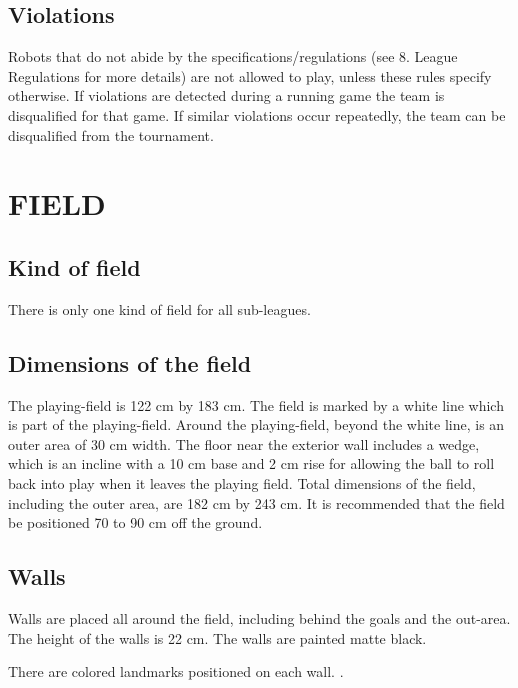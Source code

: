 \documentclass{article}
\begin{document}
\subsection{ Violations \label{ref-027}}

Robots that do not abide by the specifications/regulations (see 8. League
Regulations for more details) are not allowed to play, unless these rules
specify otherwise. If violations are detected during a running game the team is
disqualified for that game. If similar violations occur repeatedly, the team
can be disqualified from the tournament.

\section{FIELD \label{ref-028}}

\subsection{Kind of field \label{ref-029}}

There is only one kind of field for all sub-leagues.

\subsection{ Dimensions of the field \label{ref-030}}

The playing-field is 122 cm by 183 cm. The field is marked by a white line
which is part of the playing-field. Around the playing-field, beyond the white
line, is an outer area of 30 cm width. The floor near the exterior wall
includes a wedge, which is an incline with a 10 cm base and 2 cm rise for
allowing the ball to roll back into play when it leaves the playing field.
Total dimensions of the field, including the outer area, are 182 cm by 243 cm.
It is recommended that the field be positioned 70 to 90 cm off the ground.

\subsection{ Walls \label{ref-031}}

Walls are placed all around the field, including behind the goals and the
out-area. The height of the walls is 22 cm. The walls are painted matte black.

There are colored landmarks positioned on each wall. .
\end{document}
